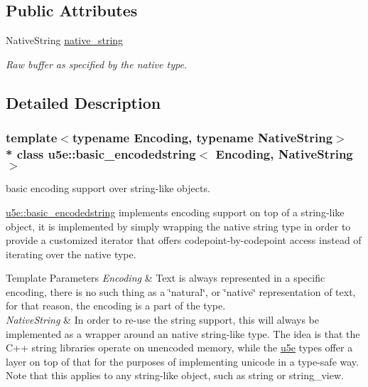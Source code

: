 \begin{DoxyCompactItemize}
\end{DoxyCompactItemize}

\subsection*{Public Attributes}
\begin{DoxyCompactItemize}
\item 
Native\+String \hyperlink{classu5e_1_1basic__encodedstring_af0569e45cfb2fe1321f0af84b460822b}{native\+\_\+string}
\begin{DoxyCompactList}\small\item\em Raw buffer as specified by the native type. \end{DoxyCompactList}\end{DoxyCompactItemize}


\subsection{Detailed Description}
\subsubsection*{template$<$typename Encoding, typename Native\+String$>$\\*
class u5e\+::basic\+\_\+encodedstring$<$ Encoding, Native\+String $>$}

basic encoding support over string-\/like objects. 

\hyperlink{classu5e_1_1basic__encodedstring}{u5e\+::basic\+\_\+encodedstring} implements encoding support on top of a string-\/like object, it is implemented by simply wrapping the native string type in order to provide a customized iterator that offers codepoint-\/by-\/codepoint access instead of iterating over the native type.


\begin{DoxyTemplParams}{Template Parameters}
{\em Encoding} & Text is always represented in a specific encoding, there is no such thing as a \char`\"{}natural\char`\"{}, or \char`\"{}native\char`\"{} representation of text, for that reason, the encoding is a part of the type.\\
\hline
{\em Native\+String} & In order to re-\/use the string support, this will always be implemented as a wrapper around an native string-\/like type. The idea is that the C++ string libraries operate on unencoded memory, while the \hyperlink{namespaceu5e}{u5e} types offer a layer on top of that for the purposes of implementing unicode in a type-\/safe way. Note that this applies to any \textquotesingle{}string-\/like\textquotesingle{} object, such as string or string\+\_\+view. \\
\hline
\end{DoxyTemplParams}


